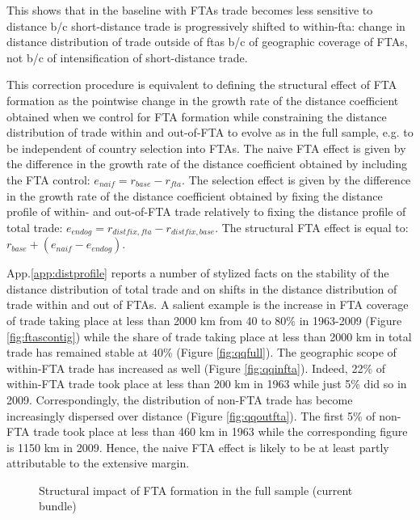 \documentclass[12pt,twoside,a4paper,notitlepage]{article}
\begin{document}
This shows that in the baseline with FTAs trade becomes less sensitive to distance b/c short-distance trade is progressively shifted to within-fta: change in distance distribution of trade outside of ftas b/c of geographic coverage of FTAs, not b/c of intensification of short-distance trade.

This correction procedure is equivalent to defining the structural effect of FTA formation as the pointwise change in the growth rate of the distance coefficient obtained when we control for FTA formation while constraining the distance distribution of trade within and out-of-FTA to evolve as in the full sample, e.g.
to be independent of country selection into FTAs.
The naive FTA effect is given by the difference in the growth rate of the distance coefficient obtained by including the FTA control: $e_{naif}=r_{base}-r_{fta}$.
The selection effect is given by the difference in the growth rate of the distance coefficient obtained by fixing the distance profile of within- and out-of-FTA trade relatively to fixing the distance profile of total trade: $e_{endog}=r_{distfix,fta}-r_{distfix,base}$.
The structural FTA effect is equal to: $r_{base}+(e_{naif}-e_{endog})$.


App.\ref{app:distprofile} reports a number of stylized facts on the stability of the distance distribution of total trade and on shifts in the distance distribution of trade within and out of FTAs.
A salient example is the increase in FTA coverage of trade taking place at less than 2000 km from 40 to 80\% in 1963-2009 (Figure \ref{fig:ftascontig}) while the share of trade taking place at less than 2000 km in total trade has remained stable at 40\% (Figure \ref{fig:qqfull}).
The geographic scope of within-FTA trade has increased as well (Figure \ref{fig:qqinfta}).
Indeed, 22\% of within-FTA trade took place at less than 200 km in 1963 while just 5\% did so in 2009.
Correspondingly, the distribution of non-FTA trade has become increasingly dispersed over distance (Figure \ref{fig:qqoutfta}).
The first 5\% of non-FTA trade took place at less than 460 km in 1963 while the corresponding figure is 1150 km in 2009.
Hence, the naive FTA effect is likely to be at least partly attributable to the extensive margin.
 

\begin{figure}[h!]
\caption{Structural impact of FTA formation in the full sample (current bundle) \label{fig:ftacorrfull}}
\begin{center}
\setlength{\fboxrule}{1pt} %
\setlength{\fboxsep}{.1in} %
\end{center}
\end{figure}   
\end{document}
